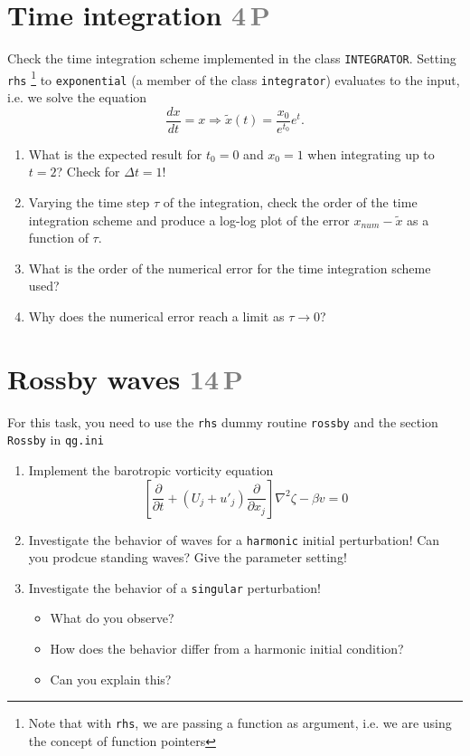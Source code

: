 \documentclass[jobname=project, 10pt]{article}
\newcommand{\p}{\partial}       %
\newcommand{\task}[2]{\section{#1 \hfill \normalsize\normalfont \textcolor{gray}{#2\,P}}\addtocounter{ptot}{#2}}
\newcounter{ptot}
\begin{document}
\task{Time integration}{4} 
Check the time integration scheme implemented in the class \texttt{INTEGRATOR}. Setting \texttt{rhs} \footnote{Note that with \texttt{rhs}, we are passing a function as argument, i.e. we are using the concept of function pointers} to \texttt{exponential} (a member of the class \texttt{integrator}) evaluates to the input, i.e. we solve the equation
\[\frac{d x}{d t} = x \Rightarrow \tilde{x}(t) = \frac{x_0}{e^{t_0}} e^t. \]

\begin{enumerate}[label=\alph*)]
\item What is the expected result  for $t_0=0$ and $x_0=1$ when integrating up to $t=2$? Check for $\Delta t=1$!
\item Varying the time step $\tau$ of the integration, check the order of the time integration scheme
  and produce a log-log plot of the error $x_{num} - \tilde{x}$ as a function of $\tau$.
\item What is the order of the numerical error for the time integration scheme used?
\item Why does the numerical error reach a limit as $\tau \rightarrow 0$? 
\end{enumerate}

\task{Rossby waves}{14}
For this task, you need to use the \texttt{rhs} dummy routine \texttt{rossby} and the section \texttt{Rossby} in \texttt{qg.ini}
\begin{enumerate}[label=\alph*)]
\item Implement the barotropic vorticity equation
  \[ \left[\frac{\p}{\p t} + \left(U_j + {u'}_j\right) \frac{\p}{\p x_j}\right] \nabla^2 \zeta - \beta v = 0 \]
\item Investigate the behavior of waves for a \texttt{harmonic} initial perturbation! Can you prodcue standing waves? Give the parameter setting!
\item Investigate the behavior of a \texttt{singular} perturbation!
  \begin{itemize}
  \item What do you observe?
  \item How does the behavior differ from a harmonic initial condition?
  \item Can you explain this?
  \end{itemize}
\end{enumerate}
\end{document}
